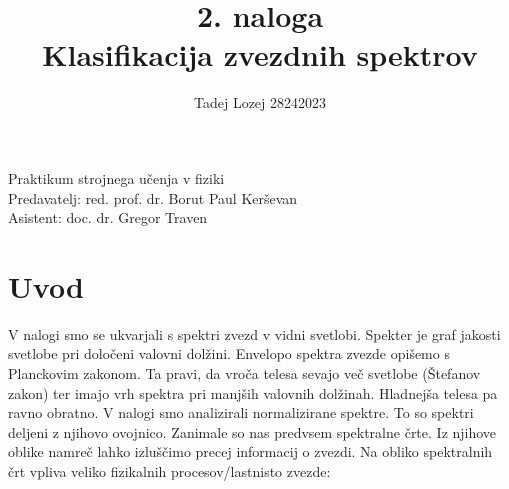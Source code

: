 \documentclass[slovene,11pt,a4paper]{article}
\begin{document}
\title{2. naloga \\ Klasifikacija zvezdnih spektrov}
\author{Tadej Lozej 28242023}
\maketitle

\begin{center}
Praktikum strojnega učenja v fiziki \\
\bigskip
Predavatelj: red. prof. dr. Borut Paul Kerševan \\
Asistent: doc. dr. Gregor Traven
\end{center}

\newpage

\tableofcontents

\newpage


\section{Uvod}

V nalogi smo se ukvarjali s spektri zvezd v vidni svetlobi. Spekter je graf jakosti svetlobe pri določeni valovni dolžini. Envelopo spektra zvezde opišemo s Planckovim zakonom. Ta pravi, da vroča telesa sevajo več svetlobe (Štefanov zakon) ter imajo vrh spektra pri manjših valovnih dolžinah. Hladnejša telesa pa ravno obratno. V nalogi smo analizirali normalizirane spektre. To so spektri deljeni z njihovo ovojnico. Zanimale so nas predvsem spektralne črte. Iz njihove oblike namreč lahko izluščimo precej informacij o zvezdi. Na obliko spektralnih črt vpliva veliko fizikalnih procesov/lastnisto zvezde:
\end{document}
